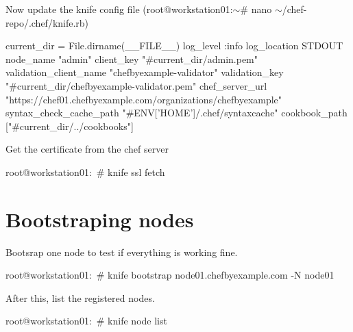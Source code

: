 Now update the knife config file (root@workstation01:\ensuremath{\sim}\# nano \ensuremath{\sim}/chef-repo/.chef/knife.rb)

\begin{codelisting}
\label{code:}
\codecaption{}
\begin{code}

current_dir = File.dirname(__FILE__)
log_level                :info
log_location             STDOUT
node_name                "admin"
client_key               "#{current_dir}/admin.pem"
validation_client_name   "chefbyexample-validator"
validation_key           "#{current_dir}/chefbyexample-validator.pem"
chef_server_url          "https://chef01.chefbyexample.com/organizations/chefbyexample"
syntax_check_cache_path  "#{ENV['HOME']}/.chef/syntaxcache"
cookbook_path            ["#{current_dir}/../cookbooks"]

\end{code}
\end{codelisting}

Get the certificate from the chef server

\begin{codelisting}
\label{code:}
\codecaption{}
\begin{code}

root@workstation01:~# knife ssl fetch

\end{code}
\end{codelisting}

\section{Bootstraping nodes}

Bootsrap one node to test if everything is working fine.

\begin{codelisting}
\label{code:}
\codecaption{}
\begin{code}

root@workstation01:~# knife bootstrap node01.chefbyexample.com -N node01

\end{code}
\end{codelisting}

After this, list the registered nodes.

\begin{codelisting}
\label{code:}
\codecaption{}
\begin{code}

root@workstation01:~# knife node list

\end{code}
\end{codelisting}


